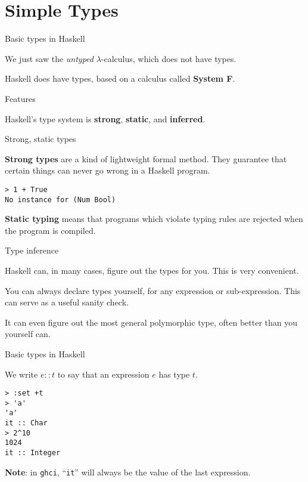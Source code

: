 
\section{Simple Types}

%
\begin{frame}{Basic types in Haskell}

We just saw the \emph{untyped} $\lambda$-calculus, which does not have types.

Haskell does have types, based on a calculus called \textbf{System F}.

\end{frame}

%
\begin{frame}{Features}

Haskell's type system is \textbf{strong}, \textbf{static}, and
\textbf{inferred}.

\end{frame}

%
\begin{frame}[fragile]{Strong, static types}

\textbf{Strong types} are a kind of lightweight formal method. They guarantee
that certain things can never go wrong in a Haskell program.

\begin{verbatim}
> 1 + True
No instance for (Num Bool)
\end{verbatim}

\textbf{Static typing} means that programs which violate typing rules are
rejected when the program is compiled.

\end{frame}

%
\begin{frame}{Type inference}

Haskell can, in many cases, figure out the types for you. This is very
convenient.

You can always declare types yourself, for any expression or sub-expression.
This can serve as a useful sanity check.

It can even figure out the most general polymorphic type, often better than you
yourself can.

\end{frame}

%
\begin{frame}[fragile]{Basic types in Haskell}

We write $e::t$ to say that an expression $e$ has type $t$.

\begin{verbatim}
> :set +t
> 'a'
'a'
it :: Char
> 2^10
1024
it :: Integer
\end{verbatim}

\textbf{Note}: in \texttt{ghci}, ``\texttt{it}'' will always be the value of the
last expression.

\end{frame}

